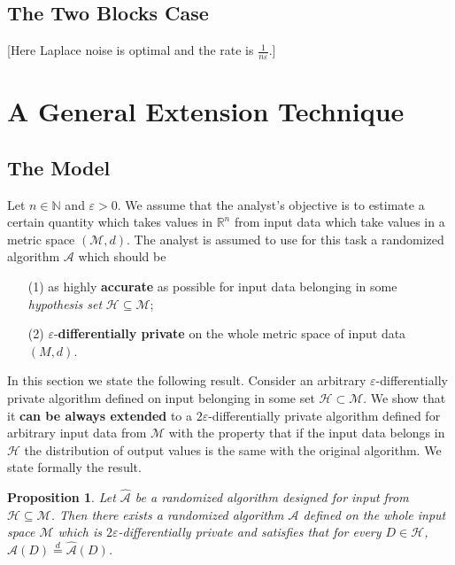\documentclass[12pt,a4paper]{article}
\numberwithin{equation}{section}
\newtheorem{proposition}[theorem]{Proposition}
\numberwithin{equation}{section}
\renewcommand{\epsilon}{\varepsilon}
\newcommand{\1}{{\text{\Large $\mathfrak 1$}}}
\newcommand{\2}[1]{{\text{\Large $\mathfrak 1$}\!\left(#1\right)}}
\begin{document}
\subsection{The Two Blocks Case}

[Here Laplace noise is optimal and the rate is $\frac{1}{n \epsilon}$.]
\section{A General Extension Technique}
\subsection*{The Model}
Let $n \in \mathbb{N}$ and $\epsilon>0$. We assume that the analyst's objective is to estimate a certain quantity which takes values in $ \mathbb{R}^n$ from input data which take values in a metric space $(\mathcal{M},d)$. The analyst is assumed to use for this task a randomized algorithm $\mathcal{A}$ which should be \begin{itemize}
\item[(1)] as highly \textbf{accurate} as possible for input data belonging in some \textit{hypothesis set} $\mathcal{H} \subseteq \mathcal{M}$;

\item[(2)] $\epsilon$-\textbf{differentially private} on the whole metric space of input data $(M,d)$.
\end{itemize}

In this section we state the following result. Consider an arbitrary $\epsilon$-differentially private algorithm defined on input belonging in some set $\mathcal{H} \subset \mathcal{M}.$ We show that it \textbf{can be always extended} to a $2\epsilon$-differentially private algorithm defined for arbitrary input data from $\mathcal{M}$ with the property that if the input data belongs in $\mathcal{H}$ the distribution of output values is the same with the original algorithm. We state formally the result. 

\begin{proposition}\label{extension}
Let $\hat{\mathcal{A}}$ be a randomized algorithm designed for input from $\mathcal{H} \subseteq \mathcal{M}$. Then there exists a randomized algorithm $\mathcal{A}$ defined on the whole input space $\mathcal{M}$ which is $2\epsilon$-differentially private and satisfies that for every $D \in \mathcal{H}$, $\mathcal{A}(D) \overset{d}{=}  \hat{\mathcal{A}}(D)$.
\end{proposition}
\end{document}
